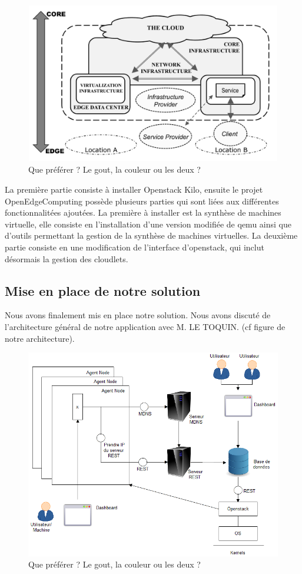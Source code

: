 \documentclass[twocolumn,a4paper]{IEEEtranfr}
\begin{document}
\begin{figure}[htpb]
  \begin{center}
    \includegraphics[width=0.8\columnwidth] {../images/open_edge.jpg}
  \end{center}
  \caption{Que préférer ? Le gout, la couleur ou les deux ?  }
  \label{fig:gouts}
\end{figure}

La première partie consiste à installer Openstack Kilo, ensuite le projet OpenEdgeComputing possède plusieurs parties qui sont liées aux différentes fonctionnalitées ajoutées. La première à installer est la synthèse de machines virtuelle, elle consiste en l’installation d’une version modifiée de qemu ainsi que d’outils permettant la gestion de la synthèse de machines virtuelles.
La deuxième partie consiste en une modification de l’interface d’openstack, qui inclut désormais la gestion des cloudlets.

\subsection{Mise en place de notre solution}

Nous avons finalement mis en place notre solution. Nous avons discuté de l’architecture général de notre application avec M. LE TOQUIN. (cf figure de notre architecture).

\begin{figure}[htpb]
  \begin{center}
    \includegraphics[width=0.7\columnwidth] {../images/schema_architecture.png}
  \end{center}
  \caption{Que préférer ? Le gout, la couleur ou les deux ?  }
  \label{fig:gouts}
\end{figure}
\end{document}
